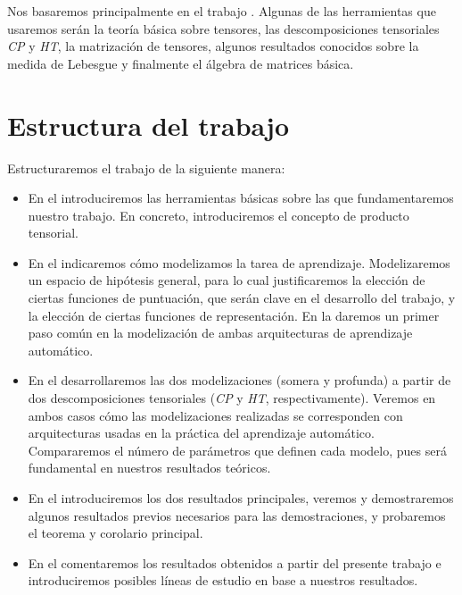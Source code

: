 Nos basaremos principalmente en el trabajo \cite{matematicas:principal}. Algunas de las herramientas que usaremos serán la teoría básica sobre tensores, las descomposiciones tensoriales \textit{CP} y \textit{HT}, la matrización de tensores, algunos resultados conocidos sobre la medida de Lebesgue y finalmente el álgebra de matrices básica.

\section{Estructura del trabajo}

Estructuraremos el trabajo de la siguiente manera:

\begin{itemize}
	\item En el  introduciremos las herramientas básicas sobre las que fundamentaremos nuestro trabajo. En concreto, introduciremos el concepto de producto tensorial.
	\item En el  indicaremos cómo modelizamos la tarea de aprendizaje. Modelizaremos un espacio de hipótesis general, para lo cual justificaremos la elección de ciertas funciones de puntuación, que serán clave en el desarrollo del trabajo, y la elección de ciertas funciones de representación. En la  daremos un primer paso común en la modelización de ambas arquitecturas de aprendizaje automático.
	\item En el  desarrollaremos las dos modelizaciones (somera y profunda) a partir de dos descomposiciones tensoriales (\textit{CP} y \textit{HT}, respectivamente). Veremos en ambos casos cómo las modelizaciones realizadas se corresponden con arquitecturas usadas en la práctica del aprendizaje automático. Compararemos el número de parámetros que definen cada modelo, pues será fundamental en nuestros resultados teóricos.
	\item En el  introduciremos los dos resultados principales, veremos y demostraremos algunos resultados previos necesarios para las demostraciones, y probaremos el teorema y corolario principal.
	\item En el  comentaremos los resultados obtenidos a partir del presente trabajo e introduciremos posibles líneas de estudio en base a nuestros resultados.
\end{itemize}
